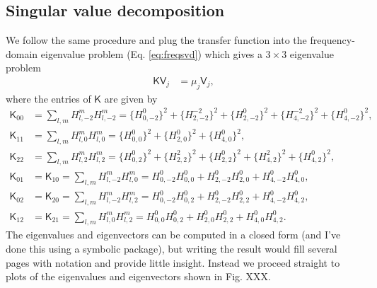 \documentclass[11pt]{article}
\begin{document}
\subsection{Singular value decomposition}
We follow the same procedure and plug the transfer function into the
frequency-domain eigenvalue problem (Eq. \ref{eq:freqsvd}) which gives a
$3\times 3$ eigenvalue problem
\begin{align}
  \mathsf{K}\mathsf{V}_j &= \mu_{j}\mathsf{V}_j,
\end{align}
where the entries of $\mathsf{K}$ are given by
\begin{align}
  \mathsf{K}_{00} &= \sum_{l,m}H_{l,-2}^{m}H_{l,-2}^{m} = \{H_{0,-2}^{0}\}^2 + \{H_{2,-2}^{-2}\}^2 + \{H_{2,-2}^{0}\}^2 + \{H_{4,-2}^{-2}\}^2 + \{H_{4,-2}^{0}\}^2,\\
  \mathsf{K}_{11} &= \sum_{l,m}H_{l,0}^{m}H_{l,0}^{m} = \{H_{0,0}^{0}\}^2 + \{H_{2,0}^{0}\}^2 + \{H_{4,0}^{0}\}^2,\\
  \mathsf{K}_{22} &= \sum_{l,m}H_{l,2}^{m}H_{l,2}^{m} = \{H_{0,2}^{0}\}^2 + \{H_{2,2}^{2}\}^2 + \{H_{2,2}^{0}\}^2 + \{H_{4,2}^{2}\}^2 + \{H_{4,2}^{0}\}^2,\\
  \mathsf{K}_{01} &= \mathsf{K}_{10} = \sum_{l,m}H_{l,-2}^{m}H_{l,0}^{m} = H_{0,-2}^{0}H_{0,0}^{0} + H_{2,-2}^{0}H_{2,0}^{0} + H_{4,-2}^{0}H_{4,0}^{0},\\
  \mathsf{K}_{02} &= \mathsf{K}_{20} = \sum_{l,m}H_{l,-2}^{m}H_{l,2}^{m} = H_{0,-2}^{0}H_{0,2}^{0} + H_{2,-2}^{0}H_{2,2}^{0} + H_{4,-2}^{0}H_{4,2}^{0},\\
  \mathsf{K}_{12} &= \mathsf{K}_{21} = \sum_{l,m}H_{l,0}^{m}H_{l,2}^{m} = H_{0,0}^{0}H_{0,2}^{0} + H_{2,0}^{0}H_{2,2}^{0} + H_{4,0}^{0}H_{4,2}^{0}.
\end{align}
The eigenvalues and eigenvectors can be computed in a closed form (and I've done
this using a symbolic package), but writing the result would fill several pages
with notation and provide little insight. Instead we proceed straight to plots
of the eigenvalues and eigenvectors shown in Fig. XXX. 

{}

\end{document}
